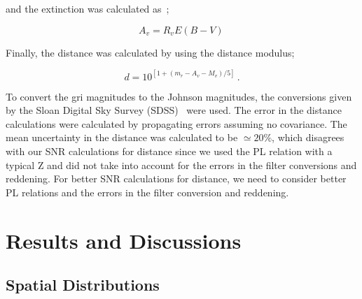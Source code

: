 \documentclass[aps,prb,twocolumn,superscriptaddress]{revtex4-1}
\begin{document}
\noindent and the extinction was calculated as~\cite{Modern};

\begin{equation}
\label{Av}
A_v = R_v E(B-V) \,
\end{equation}

\noindent Finally, the distance was calculated by using the distance modulus;

\begin{equation}
\label{dist}
d = 10^{[1+(m_r - A_v - M_v)/5]} \, .
\end{equation}

\noindent To convert the gri magnitudes to the Johnson magnitudes, the conversions given by the Sloan Digital Sky Survey (SDSS)~\cite{SDSS} were used. The error in the distance calculations were calculated by propagating errors assuming no covariance. The mean uncertainty in the distance was calculated to be $\simeq 20 \%$, which disagrees with our SNR calculations for distance since we used the PL relation with a typical Z and did not take into account for the errors in the filter conversions and reddening. For better SNR calculations for distance, we need to consider better PL relations and the errors in the filter conversion and reddening.  



\section{Results and Discussions}

\subsection{Spatial Distributions}
\end{document}
